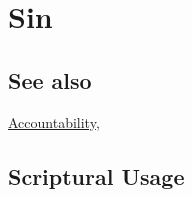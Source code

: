\section{Sin}
	\label{SIN}
	
\subsection{See also}

	\hyperref[ACCOUNTABILITY]{Accountability}, 





\subsection{Scriptural Usage} %
	\label{SIN-SCRIPTURES}

	
	

